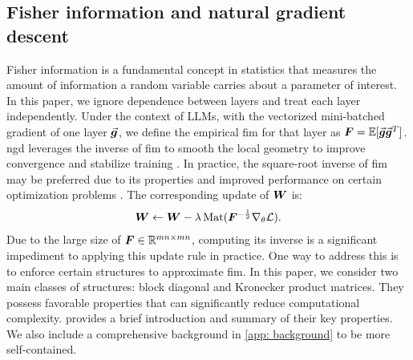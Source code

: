 \subsection{Fisher information and natural gradient descent}
\label{subsec: fisher info}
Fisher information is a fundamental concept in statistics that measures the amount of information a random variable carries about a parameter of interest. In this paper, we ignore dependence between layers and treat each layer independently. 
Under the context of LLMs, with the vectorized mini-batched gradient of one layer $\vec{\bm{g}}$, we define the empirical \gls{fim} for that layer as ${\bm{F}} = \mathbb{E}[\vec{\bm{g}}\vec{\bm{g}}^T]$.
\Gls{ngd} leverages the inverse of \gls{fim} to smooth the local geometry to improve convergence and stabilize training \citep{martens2020new}. 
In practice, the square-root inverse of \gls{fim} may be preferred due to its properties and improved performance on certain optimization problems \citep{yang2008principal, lin2024can, loshchilov2016sgdr, bergstra2012random, choi2019empirical}.  
The corresponding update of ${\bm{W}}$ is:
\begin{align}
    {\bm{W}}\leftarrow {\bm{W}}-\lambda \operatorname{Mat}({\bm{F}}^{-\frac{1}{2}}\nabla_{\theta}\mathcal{L}).
    \label{eq: square root ngd}
\end{align}
Due to the large size of ${\bm{F}}\in\mathbb{R}^{mn\times mn}$, computing its inverse is a significant impediment to applying this update rule in practice. One way to address this is to enforce certain structures to approximate \gls{fim}. In this paper, we consider two main classes of structures: block diagonal and Kronecker product matrices. They possess favorable properties that can significantly reduce computational complexity.  provides a brief introduction and summary of their key properties. We also include a comprehensive background in \cref{app: background} to be more self-contained.